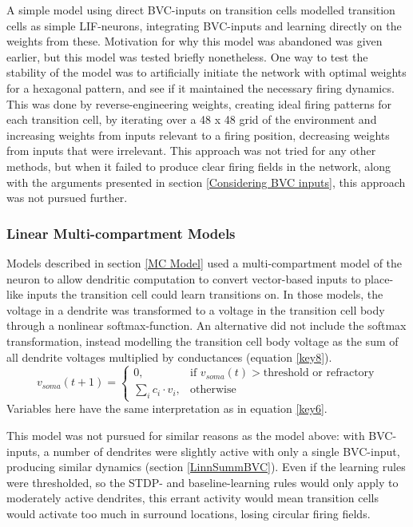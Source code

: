 \documentclass{article}
\begin{document}
    A simple model using direct BVC-inputs on transition cells modelled transition cells as simple LIF-neurons, integrating BVC-inputs and learning directly on the weights from these. Motivation for why this model was abandoned was given earlier, but this model was tested briefly nonetheless. One way to test the stability of the model was to artificially initiate the network with optimal weights for a hexagonal pattern, and see if it maintained the necessary firing dynamics. This was done by reverse-engineering weights, creating ideal firing patterns for each transition cell, by iterating over a 48 x 48 grid of the environment and increasing weights from inputs relevant to a firing position, decreasing weights from inputs that were irrelevant. This approach was not tried for any other methods, but when it failed to produce clear firing fields in the network, along with the arguments presented in section \ref{Considering BVC inputs}, this approach was not pursued further.

    \subsubsection{Linear Multi-compartment Models} \label{Lin MCModel}

    Models described in section \ref{MC Model} used a multi-compartment model of the neuron to allow dendritic computation to convert vector-based inputs to place-like inputs the transition cell could learn transitions on. In those models, the voltage in a dendrite was transformed to a voltage in the transition cell body through a nonlinear softmax-function. An alternative did not include the softmax transformation, instead modelling the transition cell body voltage as the sum of all dendrite voltages multiplied by conductances (equation \ref{key8}). \begin{equation}\label{key8} v_{soma}(t + 1) = \begin{cases} 0, & \text{if } v_{soma}(t) > \text{threshold or refractory}\\
        \sum_{i}^{} c_i \cdot v_i, & \text{otherwise} \end{cases}\end{equation} 
    Variables here have the same interpretation as in equation \ref{key6}.

    This model was not pursued for similar reasons as the model above: with BVC-inputs, a number of dendrites were slightly active with only a single BVC-input, producing similar dynamics (section \ref{LinnSummBVC}). Even if the learning rules were thresholded, so the STDP- and baseline-learning rules would only apply to moderately active dendrites, this errant activity would mean transition cells would activate too much in surround locations, losing circular firing fields.
\end{document}
